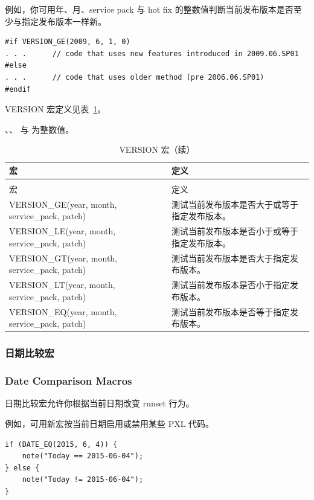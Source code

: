 例如，你可用年、月、service pack 与 hot fix 的整数值判断当前发布版本是否至少与指定发布版本一样新。
\begin{lstlisting}[style=pxl]
#if VERSION_GE(2009, 6, 1, 0)
. . .      // code that uses new features introduced in 2009.06.SP01
#else
. . .      // code that uses older method (pre 2006.06.SP01)
#endif
\end{lstlisting}

VERSION 宏定义见表~\ref{tab:pxl-version-macros}。

\begin{noteBox}
、、 与  为整数值。
\end{noteBox}

\begin{longtable}{@{}>{\raggedright\arraybackslash\ttfamily}p{} p{}@{}}
\caption{VERSION 宏}\label{tab:pxl-version-macros}\\
\toprule
宏 & 定义 \\
\midrule
\endfirsthead
\caption[]{VERSION 宏（续）}\\
\toprule
宏 & 定义 \\
\midrule
\endhead
\bottomrule
\endfoot
VERSION\_GE(year, month, service\_pack, patch) & 测试当前发布版本是否大于或等于指定发布版本。 \\
VERSION\_LE(year, month, service\_pack, patch) & 测试当前发布版本是否小于或等于指定发布版本。 \\
VERSION\_GT(year, month, service\_pack, patch) & 测试当前发布版本是否大于指定发布版本。 \\
VERSION\_LT(year, month, service\_pack, patch) & 测试当前发布版本是否小于指定发布版本。 \\
VERSION\_EQ(year, month, service\_pack, patch) & 测试当前发布版本是否等于指定发布版本。 \\
\end{longtable}

\subsubsection{日期比较宏}
\subsubsection*{Date Comparison Macros}

日期比较宏允许你根据当前日期改变 runset 行为。

例如，可用新宏按当前日期启用或禁用某些 PXL 代码。
\begin{lstlisting}[style=pxl]
if (DATE_EQ(2015, 6, 4)) {
    note("Today == 2015-06-04");
} else {
    note("Today != 2015-06-04");
}
\end{lstlisting}

